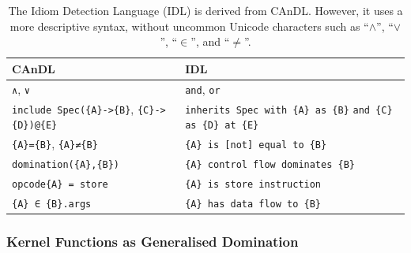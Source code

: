 \begin{table}[H]
    \lstset{keepspaces}
    \centering
    \begin{tabular}{p{}p{}}
        \toprule
        {\bf CAnDL} & {\bf IDL}\\
        \midrule
        {\lstinline[language=CAnDL]!∧!}, {\lstinline[language=CAnDL]!∨!} &
        {\lstinline[language=IDL]!and!}, {\lstinline[language=IDL]!or!} \\
        {\lstinline[language=CAnDL]!include Spec({A}->{B}!}, \vspace{-2.5mm}\newline
        {\phantom{\lstinline[language=CAnDL]!include Spec(!}\lstinline[language=CAnDL]!{C}->{D})@{E}!} &
        {\lstinline[language=IDL]!inherits Spec with {A} as {B}!} \vspace{-2.5mm}\newline
        {\phantom{\lstinline[language=IDL]!inherits Spec!}\hspace{4.4mm}\lstinline[language=IDL]!and {C} as {D} at {E}!}\\
        {\lstinline[language=CAnDL]!{A}={B}!},
        {\lstinline[language=CAnDL]!{A}≠{B}!} &
        {\lstinline[language=IDL]!{A} is [not] equal to {B}!} \\
        {\lstinline[language=CAnDL]!domination({A},{B})!} &
        {\lstinline[language=IDL]!{A} control flow dominates {B}!} \\
        {\lstinline[language=CAnDL]!opcode{A} = store!} &
        {\lstinline[language=IDL]!{A} is store instruction!} \\
        {\lstinline[language=CAnDL]!{A} ∈ {B}.args!} &
        {\lstinline[language=IDL]!{A} has data flow to {B}!} \\
        \bottomrule
    \end{tabular}
    \caption{The Idiom Detection Language (IDL) is derived from CAnDL.
             However, it uses a more descriptive syntax, without uncommon
             Unicode characters such as ``$\land$'', ``$\lor$'', ``$\in$'',
             and ``$\neq$''.}
    \label{CanDLtoIDL}
\end{table}

\subsubsection{Kernel Functions as Generalised Domination}

